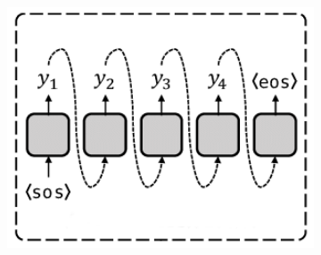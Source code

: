 \documentclass[
  12pt,
]{article}
\theoremstyle{plain}
\theoremstyle{remark}
\begin{document}
\begin{figure}

\begin{minipage}{0.50\linewidth}

\begin{figure}[H]

{\centering \includegraphics[width=5in,height=5.14583in]{Generative Model Overview_files/mediabag/1-PLsOLk_kmYwW59UeYh.png}

}


\end{figure}%

\end{minipage}%
%
\begin{minipage}{0.50\linewidth}

\begin{figure}[H]


\end{figure}
\end{minipage}
\end{figure}
\end{document}
